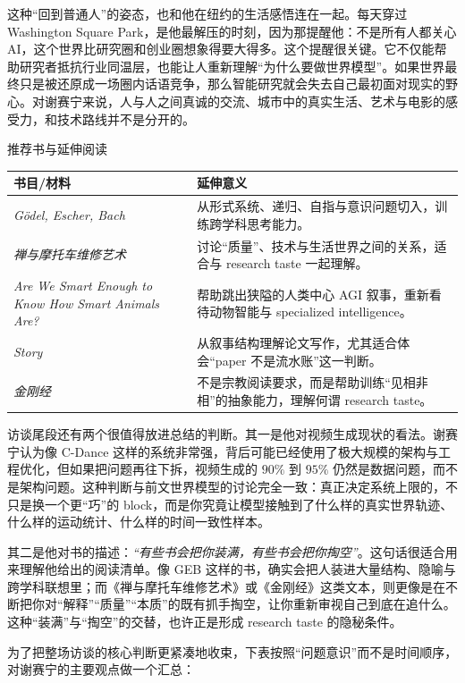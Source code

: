 这种“回到普通人”的姿态，也和他在纽约的生活感悟连在一起。每天穿过 Washington Square Park，是他最解压的时刻，因为那提醒他：不是所有人都关心 AI，这个世界比研究圈和创业圈想象得要大得多。这个提醒很关键。它不仅能帮助研究者抵抗行业同温层，也能让人重新理解“为什么要做世界模型”。如果世界最终只是被还原成一场圈内话语竞争，那么智能研究就会失去自己最初面对现实的野心。对谢赛宁来说，人与人之间真诚的交流、城市中的真实生活、艺术与电影的感受力，和技术路线并不是分开的。

\begin{knowledgebox}{推荐书与延伸阅读}
\begin{tabularx}{\textwidth}{>{\raggedright\arraybackslash}p{} Y}
\toprule
书目/材料 & 延伸意义 \\
\midrule
\textit{Gödel, Escher, Bach} & 从形式系统、递归、自指与意识问题切入，训练跨学科思考能力。 \\
\textit{禅与摩托车维修艺术} & 讨论“质量”、技术与生活世界之间的关系，适合与 research taste 一起理解。 \\
\textit{Are We Smart Enough to Know How Smart Animals Are?} & 帮助跳出狭隘的人类中心 AGI 叙事，重新看待动物智能与 specialized intelligence。 \\
\textit{Story} & 从叙事结构理解论文写作，尤其适合体会“paper 不是流水账”这一判断。 \\
\textit{金刚经} & 不是宗教阅读要求，而是帮助训练“见相非相”的抽象能力，理解何谓 research taste。 \\
\bottomrule
\end{tabularx}
\end{knowledgebox}

访谈尾段还有两个很值得放进总结的判断。其一是他对视频生成现状的看法。谢赛宁认为像 C-Dance 这样的系统非常强，背后可能已经使用了极大规模的架构与工程优化，但如果把问题再往下拆，视频生成的 \(90\%\) 到 \(95\%\) 仍然是数据问题，而不是架构问题。这种判断与前文世界模型的讨论完全一致：真正决定系统上限的，不只是换一个更“巧”的 block，而是你究竟让模型接触到了什么样的真实世界轨迹、什么样的运动统计、什么样的时间一致性样本。

其二是他对书的描述：\textit{``有些书会把你装满，有些书会把你掏空''}。这句话很适合用来理解他给出的阅读清单。像 GEB 这样的书，确实会把人装进大量结构、隐喻与跨学科联想里；而《禅与摩托车维修艺术》或《金刚经》这类文本，则更像是在不断把你对“解释”“质量”“本质”的既有抓手掏空，让你重新审视自己到底在追什么。这种“装满”与“掏空”的交替，也许正是形成 research taste 的隐秘条件。

为了把整场访谈的核心判断更紧凑地收束，下表按照“问题意识”而不是时间顺序，对谢赛宁的主要观点做一个汇总：

